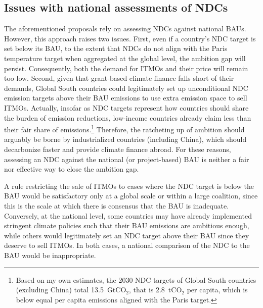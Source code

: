 \documentclass[12pt,english]{article}
\begin{document}
\subsection{Issues with national assessments of NDCs}
The aforementioned proposals %
rely on assessing NDCs against national BAUs. However, this approach raises two issues. 
First, even if a country's NDC target is set below its BAU, to the extent that NDCs do not align with the Paris temperature target when aggregated at the global level, the ambition gap will persist. %
Consequently, both the demand for ITMOs and their price will remain too low. Second, given that %
grant-based climate finance falls short of their demands, Global South countries could legitimately set up unconditional NDC emission targets above their BAU emissions to use extra emission space to sell ITMOs. Actually, insofar as NDC targets represent how countries should share the burden of emission reductions, low-income countries already claim less than their fair share of emissions.\footnote{Based on my own estimates, the 2030 NDC targets of Global South countries (excluding China) total 13.5~GtCO$_\text{2}$, that is 2.8~tCO$_\text{2}$ per capita, which is below equal per capita emissions aligned with the Paris target.} %
Therefore, the ratcheting up of ambition should arguably be borne by industrialized countries (including China), which should decarbonize faster and provide climate finance abroad. For these reasons, assessing an NDC against the national (or project-based) BAU is neither a fair nor effective way to close the ambition gap. %

A rule restricting the sale of ITMOs to cases where the NDC target is below the BAU would be satisfactory only at a global scale or within a large coalition, since this is the scale at which there is consensus that the BAU is inadequate.
Conversely, at the national level, some countries may have already implemented stringent climate policies %
such that their BAU emissions are ambitious enough, while others would legitimately set an NDC target above their BAU since they deserve to sell ITMOs. In both cases, a national comparison of the NDC to the BAU would be inappropriate. 
\end{document}
